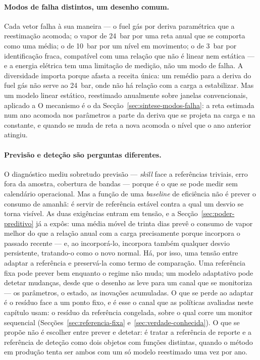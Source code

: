 \paragraph{Modos de falha distintos, um desenho comum.} Cada vetor falha à
sua maneira --- o fuel gás por deriva paramétrica que a reestimação acomoda;
o vapor de 24~bar por uma reta anual que se comporta como uma média; o de
10~bar por um nível em movimento; o de 3~bar por identificação fraca,
compatível com uma relação que não é linear nem estática --- e a energia
elétrica tem uma limitação de medição, não um modo de falha. A diversidade
importa porque afasta a receita única: um remédio para a deriva do fuel gás
não serve ao 24~bar, onde não há relação com a carga a estabilizar. Mas  um modelo linear estático, reestimado
anualmente sobre janelas convencionais, aplicado a  O mecanismo é o da Secção~\ref{sec:sintese-modos-falha}:
a reta estimada num ano acomoda nos parâmetros a parte da deriva que se
projeta na carga e na constante, e quando se muda de reta a nova acomoda o
nível que o ano anterior atingiu.

\paragraph{Previsão e deteção são perguntas diferentes.} O diagnóstico mediu
sobretudo previsão --- \emph{skill} face a referências triviais, erro fora
da amostra, cobertura de bandas --- porque é o que se pode medir sem
calendário operacional. Mas a função de uma \emph{baseline} de eficiência
não é prever o consumo de amanhã: é servir de referência estável contra a
qual um desvio se torna visível. As duas exigências entram em tensão, e a
Secção~\ref{sec:poder-preditivo} já a expôs: uma média móvel de trinta dias
prevê o consumo de vapor melhor do que a relação anual com a carga
precisamente porque incorpora o passado recente --- e, ao incorporá-lo,
incorpora também qualquer desvio persistente, tratando-o como o novo
normal. Há, por isso, uma tensão entre adaptar a referência e
preservá-la como termo de comparação. Uma referência fixa pode prever bem
enquanto o regime não muda; um modelo adaptativo pode detetar mudanças,
desde que o desenho as leve para um canal que se monitoriza --- os
parâmetros, o estado, as inovações acumuladas. O que se perde ao adaptar é o
resíduo face a um ponto fixo, e é esse o canal que as políticas avaliadas
neste capítulo usam: o resíduo da referência congelada, sobre o qual corre
um monitor sequencial (Secções~\ref{sec:referencia-fixa}
e~\ref{sec:verdade-conhecida}). O que se propõe não é escolher entre prever
e detetar: é tratar a referência de reporte e a referência de deteção como
dois objetos com funções distintas, quando o método em produção tenta ser
ambos com um só modelo reestimado uma vez por ano.

